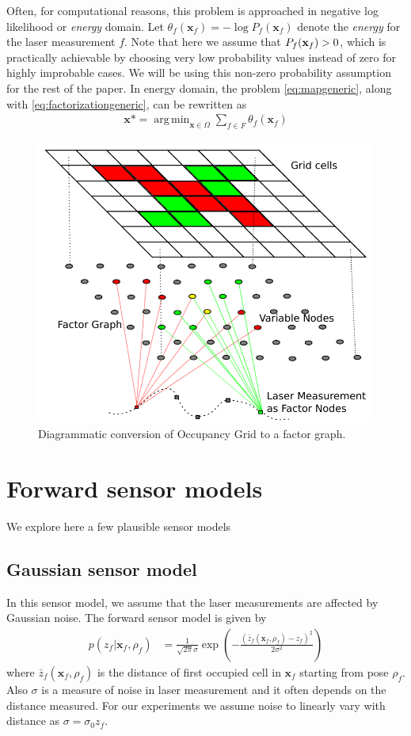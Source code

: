 \documentclass[letterpaper, 10 pt, conference]{ieeeconf} %
\DeclareMathOperator*{\argmin}{arg\,min}
\newcommand{\vect}[1]{\mathbf{#1}}
\begin{document}
Often, for computational reasons, this problem is approached in negative log
likelihood or \emph{energy} domain. Let 
$\theta_f(\vect{x}_f) = - \log P_f(\vect{x}_f)$ 
denote the \emph{energy} for the laser measurement $f$. Note that here we
assume that $P_f(\map_f) > 0$, which is practically achievable by
choosing very low probability values instead of zero for highly improbable
cases. We will be using this non-zero probability assumption for the rest of the paper. 
In energy domain, the problem \eqref{eq:mapgeneric}, along with
\eqref{eq:factorizationgeneric}, can be rewritten as
\begin{align}
  \vect{x}* = \argmin_{\vect{x} \in \Omega} \sum_{f \in F} \theta_f(\vect{x}_f)
\end{align}
\begin{figure}
  \includegraphics[width=\columnwidth]{../figures/factorgraph/factorgraph.pdf}
  \caption{Diagrammatic conversion of Occupancy Grid to a factor graph.}
  \label{fig:factor-graph}
\end{figure}

\section{Forward sensor models}
We explore here a few plausible sensor models
\subsection{Gaussian sensor model}
\newcommand{\actz}{\bar{z}_f(\vect{x}_f, \rho_f)}
In this sensor model, we assume that the laser measurements are affected by Gaussian noise. The forward sensor model is given by
\begin{align}
  p(z_f|\vect{x}_f, \rho_f) &=
  \frac{1}{\sqrt{2\pi}\sigma}\exp\left(-\frac{(\actz - z_f)^2}{2\sigma^2}\right)
  \label{eq:gaussiansensormodel}
\end{align}
where $\actz$ is the distance of first occupied cell in $\vect{x}_f$ starting from pose $\rho_f$. Also $\sigma$ is a measure of noise in laser measurement and it often depends on the distance measured. For our experiments we assume noise to linearly vary with distance as $\sigma = \sigma_0z_f$. 
\end{document}
